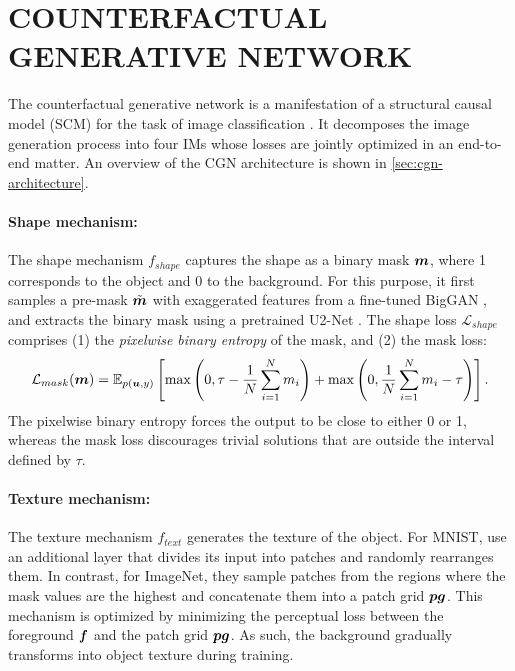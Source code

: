 \section{COUNTERFACTUAL GENERATIVE NETWORK} \label{sec:cgn}

The counterfactual generative network is a manifestation of a structural causal model (SCM) for the task of image classification \cite{Sauer2021ICLR}. It decomposes the image generation process into four IMs whose losses are jointly optimized in an end-to-end matter. An overview of the CGN architecture is shown in \cref{sec:cgn-architecture}.

\paragraph{Shape mechanism:} The shape mechanism $f_{shape}$ captures the shape as a binary mask $\boldsymbol{m}$, where 1 corresponds to the object and 0 to the background. For this purpose, it first samples a pre-mask $\tilde{\boldsymbol{m}}$ with exaggerated features from a fine-tuned BigGAN \cite{brock2018large}, and extracts the binary mask using a pretrained U2-Net \cite{qin2020u2}.
The shape loss $\mathcal{L}_{shape}$ comprises
(1) the \emph{pixelwise binary entropy} of the mask, and (2) the mask loss:
\begin{equation} \label{eq:MASK-loss}
    \mathcal{L}_{mask}(\boldsymbol{m}) = \mathbb{E}_{p(\boldsymbol{u}, y)} \left[\max \left(0, \tau - \frac{1}{N} \sum_{i=1}^N m_i \right) + \max \left(0, \frac{1}{N} \sum_{i=1}^N m_i - \tau \right) \right].
\end{equation}
The pixelwise binary entropy forces the output to be close to either 0 or 1, whereas the mask loss discourages trivial solutions that are outside the interval defined by $\tau$.

\paragraph{Texture mechanism:} The texture mechanism $f_{text}$ generates the texture of the object. For MNIST, \citeauthor{Sauer2021ICLR} use an additional layer that divides its input into patches and randomly rearranges them.
In contrast, for ImageNet, they sample patches from the regions where the mask values are the highest and concatenate them into a patch grid $\boldsymbol{pg}$.
This mechanism is optimized by minimizing the perceptual loss between the foreground $\boldsymbol{f}$ and the patch grid $\boldsymbol{pg}$. As such, the background gradually transforms into object texture during training.
